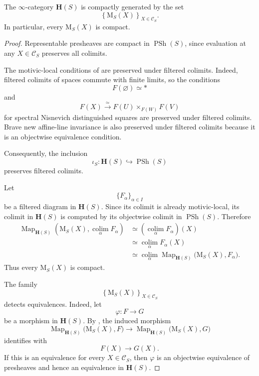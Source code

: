 \begin{proposition}
\label{prop:brave-new-motivic-compact-generation}
The \(\infty\)-category \(\mathbf H(S)\) is compactly generated by the
set
\[
    \left\{
        \mathrm M_S(X)
    \right\}_{X\in\mathcal C_S}.
\]
In particular, every \(\mathrm M_S(X)\) is compact.
\end{proposition}

\begin{proof}
Representable presheaves are compact in
\(\operatorname{PSh}(S)\), since evaluation at any
\(X\in\mathcal C_S\) preserves all colimits.

The motivic-local conditions of
are preserved under filtered colimits. Indeed, filtered colimits of
spaces commute with finite limits, so the conditions
\[
    F(\varnothing)
    \simeq
    *
\]
and
\[
    F(X)
    \xrightarrow{\simeq}
    F(U)
    \times_{F(W)}
    F(V)
\]
for spectral Nisnevich distinguished squares are preserved under
filtered colimits. Brave new affine-line invariance is also preserved
under filtered colimits because it is an objectwise equivalence
condition.

Consequently, the inclusion
\[
    \iota_S
    \colon
    \mathbf H(S)
    \hookrightarrow
    \operatorname{PSh}(S)
\]
preserves filtered colimits.

Let
\[
    \{F_\alpha\}_{\alpha\in I}
\]
be a filtered diagram in \(\mathbf H(S)\). Since its colimit is already
motivic-local, its colimit in \(\mathbf H(S)\) is computed by its
objectwise colimit in \(\operatorname{PSh}(S)\). Therefore
\[
\begin{aligned}
    \operatorname{Map}_{\mathbf H(S)}
    \left(
        \mathrm M_S(X),
        \operatorname*{colim}_{\alpha}F_\alpha
    \right)
    &\simeq
    \left(
        \operatorname*{colim}_{\alpha}F_\alpha
    \right)(X)
    \\
    &\simeq
    \operatorname*{colim}_{\alpha}F_\alpha(X)
    \\
    &\simeq
    \operatorname*{colim}_{\alpha}
    \operatorname{Map}_{\mathbf H(S)}
    \bigl(
        \mathrm M_S(X),
        F_\alpha
    \bigr).
\end{aligned}
\]
Thus every \(\mathrm M_S(X)\) is compact.

The family
\[
    \left\{
        \mathrm M_S(X)
    \right\}_{X\in\mathcal C_S}
\]
detects equivalences. Indeed, let
\[
    \varphi
    \colon
    F
    \longrightarrow
    G
\]
be a morphism in \(\mathbf H(S)\). By
,
the induced morphism
\[
    \operatorname{Map}_{\mathbf H(S)}
    \bigl(
        \mathrm M_S(X),
        F
    \bigr)
    \longrightarrow
    \operatorname{Map}_{\mathbf H(S)}
    \bigl(
        \mathrm M_S(X),
        G
    \bigr)
\]
identifies with
\[
    F(X)
    \longrightarrow
    G(X).
\]
If this is an equivalence for every \(X\in\mathcal C_S\), then
\(\varphi\) is an objectwise equivalence of presheaves and hence an
equivalence in \(\mathbf H(S)\).


\end{proof}
